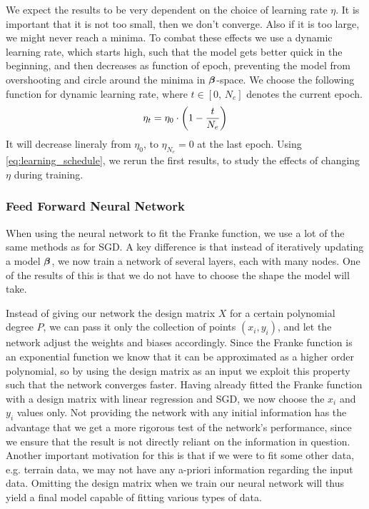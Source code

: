 \documentclass[12pt]{extarticle}
\begin{document}
We expect the results to be very dependent on the choice of learning rate $\eta$. It is important that it is not too small, then we don't converge. Also if it is too large, we might never reach a minima. To combat these effects we use a dynamic learning rate, which starts high, such that the model gets better quick in the beginning, and then decreases as function of epoch, preventing the model from overshooting and circle around the minima in $\boldsymbol{\beta}$-space. We choose the following function for dynamic learning rate, where $t\in[0, \, N_e]$ denotes the current epoch.
\begin{align} \label{eq:learning_schedule}
	\eta_t = \eta_0 \cdot \left( 1 - \frac{t}{N_e} \right)
\end{align}
It will decrease lineraly from $\eta_0$, to $\eta_{N_e}=0$ at the last epoch.
Using \eqref{eq:learning_schedule}, we rerun the first results, to study the effects of changing $\eta$ during training.

\subsubsection{Feed Forward Neural Network}
When using the neural network to fit the Franke function, we use a lot of the same methods as for SGD. A key difference is that instead of iteratively updating a model $\boldsymbol{\beta}$, we now train a network of several layers, each with many nodes. One of the results of this is that we do not have to choose the shape the model will take.

Instead of giving our network the design matrix $X$ for a certain polynomial degree $P$, we can pass it only the collection of points $(x_i, y_i)$, and let the network adjust the weights and biases accordingly. Since the Franke function is an exponential function we know that it can be approximated as a higher order polynomial, so by using the design matrix as an input we exploit this property such that the network converges faster. Having already fitted the Franke function with a design matrix with linear regression and SGD, we now choose the $x_i$ and $y_i$ values only. Not providing the network with any initial information has the advantage that we get a more rigorous test of the network's performance, since we ensure that the result is not directly reliant on the information in question. Another important motivation for this is that if we were to fit some other data, e.g. terrain data, we may not have any a-priori information regarding the input data. Omitting the design matrix when we train our neural network will thus yield a final model capable of fitting various types of data.
\end{document}
